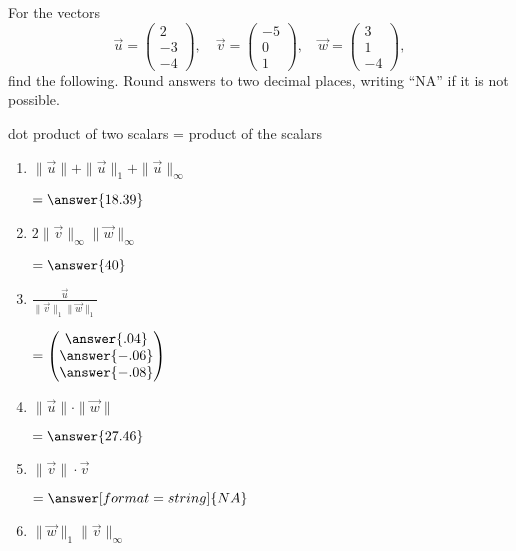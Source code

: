\documentclass{ximera}
\begin{document}
\begin{exercise}
  For the vectors
  \[
    \vec{u} = \begin{pmatrix} 2\\ -3\\ -4 \end{pmatrix}, \quad
    \vec{v} = \begin{pmatrix} -5\\ 0\\ 1 \end{pmatrix}, \quad
    \vec{w} = \begin{pmatrix} 3 \\ 1 \\ -4 \end{pmatrix},
  \]
  find the following. Round answers to two decimal places, writing
  ``NA'' if it is not possible.
  \begin{hint}
  dot product of two scalars = product of the scalars
  \end{hint}
  \begin{enumerate}
    \item $\|\vec{u}\| + \|\vec{u}\|_{1} + \|\vec{u}\|_{\infty}$
      \begin{prompt}
        $=\answer{18.39}$
      \end{prompt}
    \item $2 \|\vec{v}\|_{\infty} \|\vec{w}\|_{\infty}$
      \begin{prompt}
        $=\answer{40}$
      \end{prompt}
    \item $\frac{\vec{u}}{\|\vec{v}\|_{1} \|\vec{w}\|_{1}}$
      \begin{prompt}
        $=\begin{pmatrix}
          \answer{.04} \\
          \answer{-.06} \\
          \answer{-.08}
        \end{pmatrix}$
      \end{prompt}
    \item $\|\vec{u}\| \cdot \|\vec{w}\|$ %
      \begin{prompt}
        $=\answer{27.46}$
      \end{prompt}
    \item $\|\vec{v}\| \cdot \vec{v}$
      \begin{prompt}
        $=\answer[format=string]{NA}$
      \end{prompt}
    \item $\|\vec{w}\|_{1} \|\vec{v}\|_{\infty}$

\end{enumerate}
\end{exercise}
\end{document}
